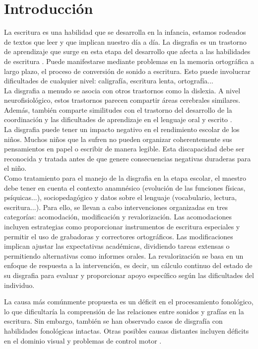 \section{Introducción}
La escritura es una habilidad que se desarrolla en la infancia, estamos rodeados de textos que leer y que implican nuestro día a día. La disgrafia es un trastorno de aprendizaje que surge en esta etapa del desarrollo que afecta a las habilidades de escritura \cite{Chung2015}. Puede manifestarse mediante problemas en la memoria ortográfica a largo plazo, el proceso de conversión de sonido a escritura. Esto puede involucrar dificultades de cualquier nivel: caligrafía, escritura lenta, ortografía...\\

La disgrafia a menudo se asocia con otros trastornos como la dislexia. A nivel neurofisiológico, estos trastornos parecen compartir áreas cerebrales similares. Además, también comparte similitudes con el trastorno del desarrollo de la coordinación y las dificultades de aprendizaje en el lenguaje oral y escrito \cite{Marek2020}. \\
La disgrafia puede tener un impacto negativo en el rendimiento escolar de los niños. Muchos niños que la sufren no pueden organizar coherentemente sus pensamientos en papel o escribir de manera legible. Esta discapacidad debe ser reconocida y tratada antes de que genere consecuencias negativas duraderas para el niño. \cite{ Crouch2007} \\

Como tratamiento para el manejo de la disgrafia en la etapa escolar, el maestro debe tener en cuenta el contexto anamnésico (evolución de las funciones físicas, psíquicas...), sociopedagógico y datos sobre el lenguaje (vocabulario, lectura, escritura...)\cite{Santana}. Para ello, se llevan a cabo intervenciones organizadas en tres categorías: acomodación, modificación y revalorización\cite{Chung2015}. Las acomodaciones incluyen estrategias como proporcionar instrumentos de escritura especiales y permitir el uso de grabadoras y correctores ortográficos. Las modificaciones implican ajustar las expectativas académicas, dividiendo tareas extensas o permitiendo alternativas como informes orales. La revalorización se basa en un enfoque de respuesta a la intervención, es decir, un cálculo continuo del estado de su disgrafia para evaluar y proporcionar apoyo específico según las dificultades del individuo.


La causa más comúnmente propuesta es un déficit en el procesamiento fonológico, lo que dificultaría la comprensión de las relaciones entre sonidos y grafías en la escritura. Sin embargo, también se han observado casos de disgrafía con habilidades fonológicas intactas. Otras posibles causas distantes incluyen déficits en el dominio visual y problemas de control motor \cite{ McCloskey2017}.\\